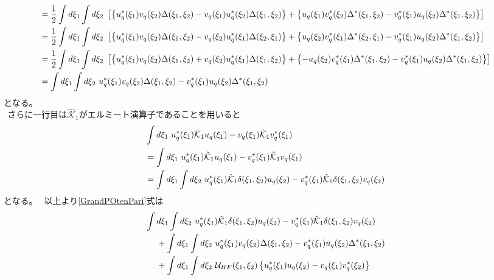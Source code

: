 \documentclass[dvipdfmx, 11pt, a4paper]{jsarticle}
\numberwithin{equation}{section}
\theoremstyle{definition}
\begin{document}
\begin{derivationBox}
\begin{align}
            &= \frac{1}{2} \int d\xi_1 \int d\xi_2\  \left[ \left\{ u_q^*(\xi_1) v_q(\xi_2)\Delta (\xi_1,\xi_2) - v_q(\xi_1) u_q^*(\xi_2)\Delta (\xi_1,\xi_2)\right\}  +  \left\{  u_q(\xi_1)v^*_q(\xi_2)\Delta^* (\xi_1,\xi_2) - v^*_q(\xi_1) u_q(\xi_2) \Delta^* (\xi_1,\xi_2) \right\} \right] \notag \\
            &= \frac{1}{2} \int d\xi_1 \int d\xi_2\  \left[ \left\{ u_q^*(\xi_1) v_q(\xi_2)\Delta (\xi_1,\xi_2) - v_q(\xi_2) u_q^*(\xi_1)\Delta (\xi_2,\xi_1)\right\}  +  \left\{  u_q(\xi_2)v^*_q(\xi_1)\Delta^* (\xi_2,\xi_1) - v^*_q(\xi_1)u_q(\xi_2) \Delta^* (\xi_1,\xi_2) \right\} \right] \notag \\
            &= \frac{1}{2} \int d\xi_1 \int d\xi_2\  \left[ \left\{ u_q^*(\xi_1) v_q(\xi_2)\Delta (\xi_1,\xi_2) + v_q(\xi_2) u_q^*(\xi_1)\Delta (\xi_1,\xi_2)\right\}  +  \left\{  -u_q(\xi_2)v^*_q(\xi_1)\Delta^* (\xi_1,\xi_2) - v^*_q(\xi_1)u_q(\xi_2) \Delta^* (\xi_1,\xi_2) \right\} \right] \notag \\
            &= \int d\xi_1 \int d\xi_2\   u_q^*(\xi_1) v_q(\xi_2)\Delta (\xi_1,\xi_2)   -    v^*_q(\xi_1)u_q(\xi_2)\Delta^* (\xi_1,\xi_2)  
        \end{align}
        となる。\\
        $\ \ $さらに一行目は$\hat{\mathcal{K}}_1$がエルミート演算子であることを用いると
        \begin{align}
            &\int d\xi_1\ u_{q}^*(\xi_1)\hat{\mathcal{K}}_1  u_{q}(\xi_1)-v_{q}(\xi_1) \hat{\mathcal{K}}_1 v_{q}^*(\xi_1) \notag \\
            &= \int d\xi_1\ u_{q}^*(\xi_1)\hat{\mathcal{K}}_1  u_{q}(\xi_1)-v_{q}^*(\xi_1) \hat{\mathcal{K}}_1 v_{q}(\xi_1) \notag \\
            &= \int d\xi_1\int d\xi_2\ u_{q}^*(\xi_1)\hat{\mathcal{K}}_1  \delta(\xi_1,\xi_2)u_{q}(\xi_2)-v_{q}^*(\xi_1) \hat{\mathcal{K}}_1 \delta(\xi_1,\xi_2) v_{q}(\xi_2)
        \end{align}
        となる。
        $\ \ $以上より\eqref{GrandPOtenPari}式は
        \begin{align}
            &\int d\xi_1\int d\xi_2\ u_{q}^*(\xi_1)\hat{\mathcal{K}}_1  \delta(\xi_1,\xi_2)u_{q}(\xi_2)-v_{q}^*(\xi_1) \hat{\mathcal{K}}_1 \delta(\xi_1,\xi_2) v_{q}(\xi_2) \notag \\
            &\ \ \ \ + \int d\xi_1 \int d\xi_2\   u_q^*(\xi_1) v_q(\xi_2)\Delta (\xi_1,\xi_2)   -    v^*_q(\xi_1)u_q(\xi_2)\Delta^* (\xi_1,\xi_2) \notag \\
            &\ \ \ \ + \int d\xi_1 \int d\xi_2\ \mathcal{U}_{HF}(\xi_1,\xi_2) \left\{  u_q^*(\xi_1)u_q(\xi_2)-v_q(\xi_1)v_q^*(\xi_2) \right\} \notag \\

\end{align}
\end{derivationBox}
\end{document}
